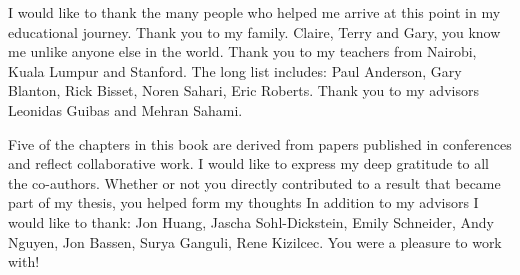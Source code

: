 I would like to thank the many people who helped me arrive at this point in my educational journey. Thank you to my family. Claire, Terry and Gary, you know me unlike anyone else in the world. Thank you to my teachers from Nairobi, Kuala Lumpur and Stanford. The long list includes: Paul Anderson, Gary Blanton, Rick Bisset, Noren Sahari, Eric Roberts. Thank you to my advisors Leonidas Guibas and Mehran Sahami. 

Five of the chapters in this book are derived from papers published in conferences and reflect collaborative work. I would like to express my deep gratitude to all the co-authors. Whether or not you directly contributed to a result that became part of my thesis, you helped form my thoughts In addition to my advisors I would like to thank: Jon Huang, Jascha Sohl-Dickstein, Emily Schneider, Andy Nguyen, Jon Bassen, Surya Ganguli, Rene Kizilcec. You were a pleasure to work with!
